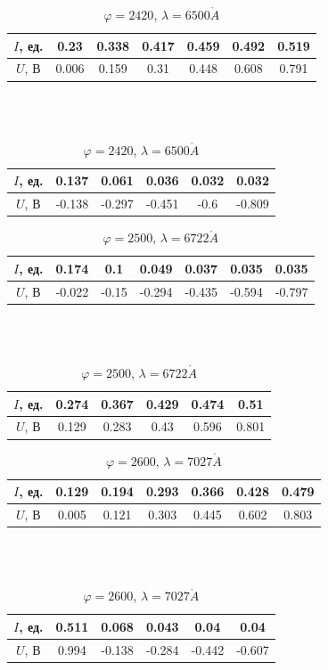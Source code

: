\documentclass[a4paper, 12pt]{article}
\renewcommand{\phi}{\varphi}
\renewcommand{\AA}{\ensuremath{\mathring{A}}}
\begin{document}
\begin{table}[H]
    \centering
    \begin{tabular}{|c|c|c|c|c|c|c|}
        \hline
        $I$, ед. & 0.23 & 0.338 & 0.417 & 0.459 & 0.492 & 0.519\\ \hline
        $U$, В   & 0.006 & 0.159 & 0.31 & 0.448 & 0.608 & 0.791
        \\ \hline
    \end{tabular}
    \\~\\
    \begin{tabular}{|c|c|c|c|c|c|}
        \hline
        $I$, ед. & 0.137 & 0.061 & 0.036 & 0.032 & 0.032\\ \hline
        $U$, В   & -0.138 & -0.297 & -0.451 & -0.6 & -0.809
        \\ \hline
    \end{tabular}
    \caption {$\phi = 2420$, $\lambda = 6500 \AA$}
\end{table}

\begin{table}[H]
    \centering
    \begin{tabular}{|c|c|c|c|c|c|c|}
        \hline
        $I$, ед. & 0.174 & 0.1 & 0.049 & 0.037 & 0.035 & 0.035\\ \hline
        $U$, В   & -0.022 & -0.15 & -0.294 & -0.435 & -0.594 & -0.797
        \\ \hline
    \end{tabular}
    \\~\\
    \begin{tabular}{|c|c|c|c|c|c|}
        \hline
        $I$, ед. & 0.274 & 0.367 & 0.429 & 0.474 & 0.51\\ \hline
        $U$, В   & 0.129 & 0.283 & 0.43 & 0.596 & 0.801
        \\ \hline
    \end{tabular}
    \caption {$\phi = 2500$, $\lambda = 6722 \AA$}
\end{table}

\begin{table}[H]
    \centering
    \begin{tabular}{|c|c|c|c|c|c|c|}
        \hline
        $I$, ед. & 0.129 & 0.194 & 0.293 & 0.366 & 0.428 & 0.479\\ \hline
        $U$, В   & 0.005 & 0.121 & 0.303 & 0.445 & 0.602 & 0.803
        \\ \hline
    \end{tabular}
    \\~\\
    \begin{tabular}{|c|c|c|c|c|c|}
        \hline
        $I$, ед. & 0.511 & 0.068 & 0.043 & 0.04 & 0.04\\ \hline
        $U$, В   & 0.994 & -0.138 & -0.284 & -0.442 & -0.607
        \\ \hline
    \end{tabular}
    \caption {$\phi = 2600$, $\lambda = 7027 \AA$}
\end{table}
\end{document}
